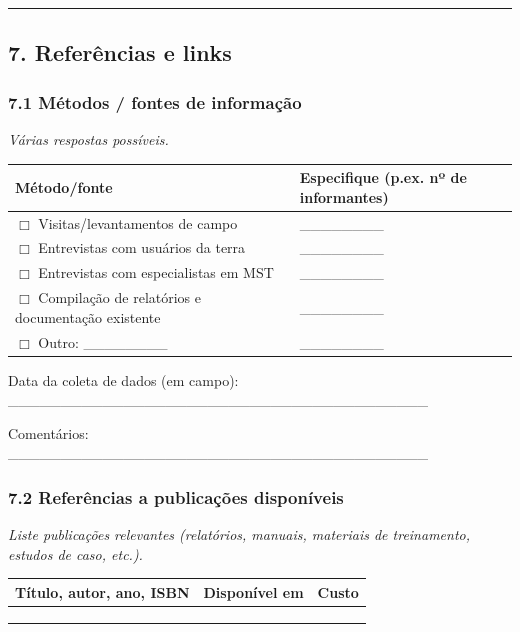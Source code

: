 \newpage

\begin{center}\rule{0.5\linewidth}{0.5pt}\end{center}

\subsection{7. Referências e links}\label{referuxeancias-e-links}

\subsubsection{7.1 Métodos / fontes de informação}\label{muxe9todos-fontes-de-informauxe7uxe3o}

\emph{Várias respostas possíveis.}

{
\begin{longtable}[]{@{}ll@{}}
\toprule\noalign{}
Método/fonte & Especifique (p.ex. nº de informantes) \\
\midrule\noalign{}
\endhead
\bottomrule\noalign{}
\endlastfoot
$\Box$ Visitas/levantamentos de campo & \_\_\_\_\_\_\_\_ \\
$\Box$ Entrevistas com usuários da terra & \_\_\_\_\_\_\_\_ \\
$\Box$ Entrevistas com especialistas em MST & \_\_\_\_\_\_\_\_ \\
$\Box$ Compilação de relatórios e documentação existente & \_\_\_\_\_\_\_\_ \\
$\Box$ Outro: \_\_\_\_\_\_\_\_ & \_\_\_\_\_\_\_\_ \\
\end{longtable}
}

Data da coleta de dados (em campo): \_\_\_\_\_\_\_\_\_\_\_\_\_\_\_\_\_\_\_\_\_\_\_\_\_\_\_\_\_\_\_\_\_\_\_\_\_\_\_\_

Comentários: \_\_\_\_\_\_\_\_\_\_\_\_\_\_\_\_\_\_\_\_\_\_\_\_\_\_\_\_\_\_\_\_\_\_\_\_\_\_\_\_

\subsubsection{7.2 Referências a publicações disponíveis}\label{referuxeancias-a-publicauxe7uxf5es-disponuxedveis}

\emph{Liste publicações relevantes (relatórios, manuais, materiais de treinamento, estudos de caso, etc.).}

{
\begin{longtable}[]{@{}lll@{}}
\toprule\noalign{}
Título, autor, ano, ISBN & Disponível em & Custo \\
\midrule\noalign{}
\endhead
\bottomrule\noalign{}
\endlastfoot
& & \\
& & \\
& & \\
\end{longtable}
}

